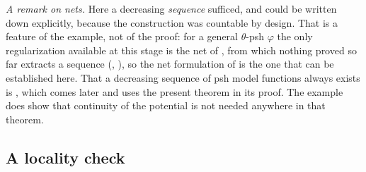 \begin{example}
\emph{A remark on nets.}  Here a decreasing \emph{sequence} sufficed, and
could be written down explicitly, because the construction was countable by
design.  That is a feature of the example, not of the proof: for a general
$\theta$-psh $\varphi$ the only regularization available at this stage
is the net of , from which nothing
proved so far extracts a sequence (,
), so the net formulation of
 is the one that can be established here.
That a decreasing sequence of psh model functions always exists is
, which comes later and uses the
present theorem in its proof.  The example does show that continuity of the
potential is not needed anywhere in that theorem.
\end{example}

\subsection{A locality check}
\label{sec:ch24-ex-locality}

